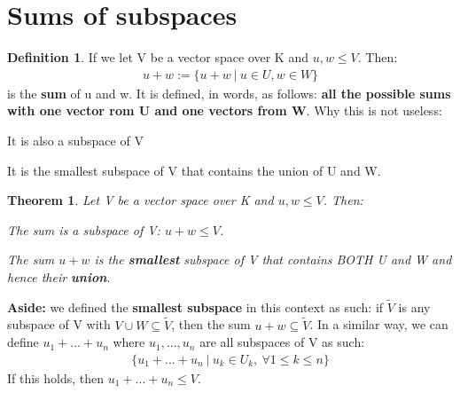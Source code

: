 \documentclass[a4paper, 12pt]{article}
\newtheorem{theorem}{Theorem}
\theoremstyle{definition}
\theoremstyle{definition}
\newtheorem{defn}{Definition}[section]
\theoremstyle{definition}
\theoremstyle{definition}
\newenvironment{enumerate_tight}{
	\begin{enumerate}
		\setlength{\itemsep}{0pt}
		\setlength{\parskip}{0pt}
	}{\end{enumerate}}
\begin{document}
{\section{Sums of subspaces}
\begin{defn}
	If we let V be a vector space over K and $u, w \leq V$. Then: 
	\begin{align}
		u + w := \{ u + w\ |\ u \in U, w \in W \} 
	\end{align}
	is the \textbf{sum} of u and w. It is defined, in words, as follows: \textbf{all the possible sums with one vector rom U and one vectors from W}. Why this is not useless: 
	\begin{enumerate_tight}
		\item It is also a subspace of V
		\item It is the smallest subspace of V that contains the union of U and W. 
	\end{enumerate_tight}
\end{defn}
\begin{theorem}
	Let V be a vector space over K and $u, w \leq V$. Then: 
	\begin{enumerate_tight}
		\item The sum is a subspace of V: $u +w \leq V$. 
		\item The sum $u +w$ is the \textbf{smallest} subspace of V that contains BOTH U and W and hence their \textbf{union}.
	\end{enumerate_tight}
\end{theorem}
\textbf{Aside:} we defined the \textbf{smallest subspace} in this context as such: if $\widetilde{V}$ is any subspace of V with $V \cup W \subseteq \widetilde{V}$, then the sum $u +  w \subseteq \widetilde{V}$. 
In a similar way, we can define $u_1 + ... + u_n$ where $u_1, ..., u_n$ are all subspaces of V as such: 
\begin{align*}
	\{ u_1 + ... + u_n\ |\ u_k \in U_k,\ \forall 1 \leq k \leq n \} 
\end{align*}
If this holds, then $u_1 + ... + u_n \leq V$. 

}
\end{document}

